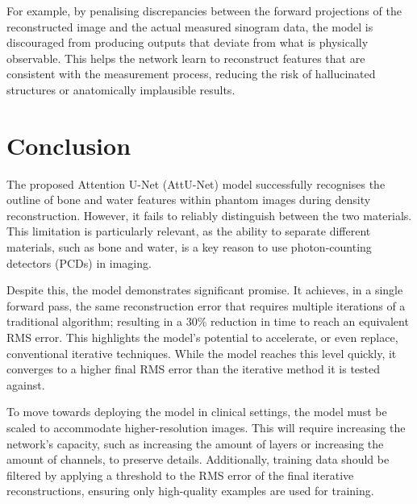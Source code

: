 \documentclass{article}
\begin{document}
For example, by penalising discrepancies between the forward projections of the reconstructed image and the actual measured sinogram data, the model is discouraged from producing outputs that deviate from what is physically observable. This helps the network learn to reconstruct features that are consistent with the measurement process, reducing the risk of hallucinated structures or anatomically implausible results.

\section{Conclusion}

The proposed Attention U-Net (AttU-Net) model successfully recognises the outline of bone and water features within phantom images during density reconstruction. However, it fails to reliably distinguish between the two materials. This limitation is particularly relevant, as the ability to separate different materials, such as bone and water, is a key reason to use photon-counting detectors (PCDs) in imaging.

Despite this, the model demonstrates significant promise. It achieves, in a single forward pass, the same reconstruction error that requires multiple iterations of a traditional algorithm; resulting in a 30\% reduction in time to reach an equivalent RMS error. This highlights the model's potential to accelerate, or even replace, conventional iterative techniques. While the model reaches this level quickly, it converges to a higher final RMS error than the iterative method it is tested against.

To move towards deploying the model in clinical settings, the model must be scaled to accommodate higher-resolution images. This will require increasing the network's capacity, such as increasing the amount of layers or increasing the amount of channels, to preserve details. Additionally, training data should be filtered by applying a threshold to the RMS error of the final iterative reconstructions, ensuring only high-quality examples are used for training.

\clearpage

\end{document}

